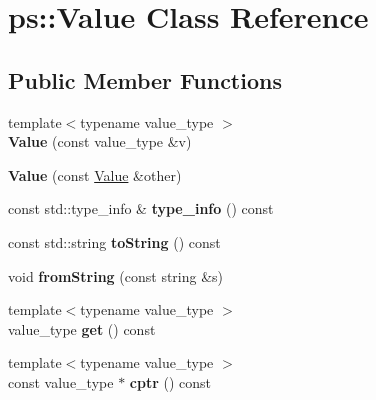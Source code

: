 \hypertarget{classps_1_1Value}{}\section{ps\+:\+:Value Class Reference}
\label{classps_1_1Value}
\subsection*{Public Member Functions}
\begin{DoxyCompactItemize}
\item 
\hypertarget{classps_1_1Value_a7a5a409ab6504185ead8845776099089}{}{\footnotesize template$<$typename value\+\_\+type $>$ }\\{\bfseries Value} (const value\+\_\+type \&v)\label{classps_1_1Value_a7a5a409ab6504185ead8845776099089}

\item 
\hypertarget{classps_1_1Value_a4583b0d7308114e9605fe1376058aa37}{}{\bfseries Value} (const \hyperlink{classps_1_1Value}{Value} \&other)\label{classps_1_1Value_a4583b0d7308114e9605fe1376058aa37}

\item 
\hypertarget{classps_1_1Value_a6e60171a80e82933e20dc0bdc0b62c8b}{}const std\+::type\+\_\+info \& {\bfseries type\+\_\+info} () const \label{classps_1_1Value_a6e60171a80e82933e20dc0bdc0b62c8b}

\item 
\hypertarget{classps_1_1Value_a9ecf352c01a0d066fc44082bb73ecd85}{}const std\+::string {\bfseries to\+String} () const \label{classps_1_1Value_a9ecf352c01a0d066fc44082bb73ecd85}

\item 
\hypertarget{classps_1_1Value_ad0aa50b9966f7a54735815d85f4555c9}{}void {\bfseries from\+String} (const string \&s)\label{classps_1_1Value_ad0aa50b9966f7a54735815d85f4555c9}

\item 
\hypertarget{classps_1_1Value_a8c51ad5966394e8eca48e32866d79a47}{}{\footnotesize template$<$typename value\+\_\+type $>$ }\\value\+\_\+type {\bfseries get} () const \label{classps_1_1Value_a8c51ad5966394e8eca48e32866d79a47}

\item 
\hypertarget{classps_1_1Value_ada466d6d562f9c44cb46fe5377ef4eb6}{}{\footnotesize template$<$typename value\+\_\+type $>$ }\\const value\+\_\+type $\ast$ {\bfseries cptr} () const \label{classps_1_1Value_ada466d6d562f9c44cb46fe5377ef4eb6}


\end{DoxyCompactItemize}
